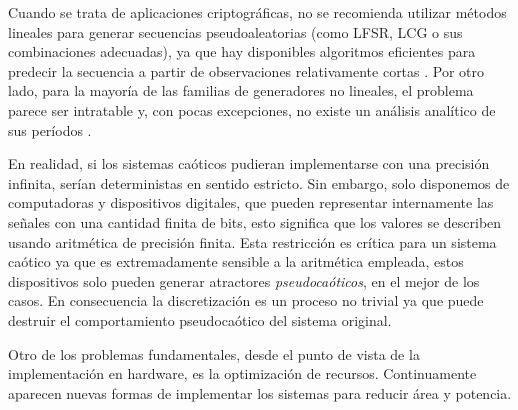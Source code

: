 Cuando se trata de aplicaciones criptográficas, no se recomienda utilizar métodos lineales para generar secuencias pseudoaleatorias (como LFSR, LCG o sus combinaciones adecuadas), ya que hay disponibles algoritmos eficientes para predecir la secuencia a partir de observaciones relativamente cortas \cite{Boyar1989}.
Por otro lado, para la mayoría de las familias de generadores no lineales, el problema parece ser intratable y, con pocas excepciones, no existe un análisis analítico de sus períodos \cite{kocarev2011}.

En realidad, si los sistemas caóticos pudieran implementarse con una precisión infinita, serían deterministas en sentido estricto.
Sin embargo, solo disponemos de computadoras y dispositivos digitales, que pueden representar internamente las señales con una cantidad finita de bits, esto significa que los valores se describen usando aritmética de precisión finita.
Esta restricción es crítica para un sistema caótico ya que es extremadamente sensible a la aritmética empleada, estos dispositivos solo pueden generar atractores \textsl{pseudocaóticos}, en el mejor de los casos.
En consecuencia la discretización es un proceso no trivial ya que puede destruir el comportamiento pseudocaótico del sistema original.

Otro de los problemas fundamentales, desde el punto de vista de la implementación en hardware, es la optimización de recursos.
Continuamente aparecen nuevas formas de implementar los sistemas para reducir área y potencia.

